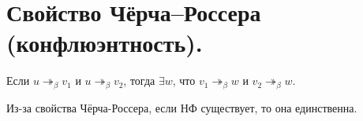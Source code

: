 \section{Свойство Чёрча–Россера (конфлюэнтность).}

\begin{theorem}
    Если $u \twoheadrightarrow_\beta v_1$ и $u \twoheadrightarrow_\beta v_2$, тогда $\exists w$, что $v_1 \twoheadrightarrow_\beta w$ и $v_2 \twoheadrightarrow_\beta w$.
\end{theorem}

\begin{corollary}
Из-за свойства Чёрча-Россера, если НФ существует, то она единственна.
\end{corollary}

